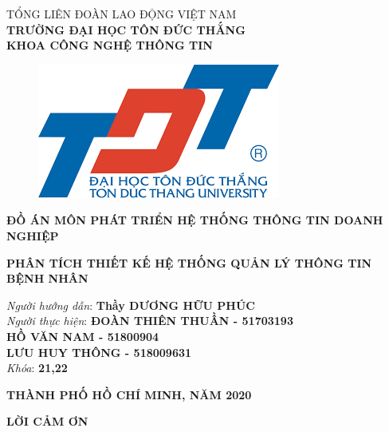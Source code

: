\documentclass{report}
\begin{document}
\begin{center}
	\fontsize{14}{20}\selectfont
	\textsc{TỔNG LIÊN ĐOÀN LAO ĐỘNG VIỆT NAM\\ 
		\textbf{TRƯỜNG ĐẠI HỌC TÔN ĐỨC THẮNG\\} 
		\textbf{KHOA CÔNG NGHỆ THÔNG TIN}}
	
	\vspace{0.08cm}
	\begin{figure}[htp]
		\begin{center}
			\includegraphics[scale=0.15]{Hinh/logo tdt.png}
		\end{center}
	\end{figure}
	
	\fontsize{16}{20}\selectfont\textbf{ĐỒ ÁN MÔN PHÁT TRIỂN HỆ THỐNG THÔNG TIN DOANH NGHIỆP\\}
	
	\vspace{1.1cm}
	\fontsize{24}{20}\selectfont\textbf{PHÂN TÍCH THIẾT KẾ HỆ THỐNG QUẢN LÝ THÔNG TIN BỆNH NHÂN}
\end{center}
\vspace{2cm}
\begin{flushright}
	\fontsize{14}{20}\selectfont
	\textit{Người hướng dẫn}: \textbf{Thầy DƯƠNG HỮU PHÚC}\\
	\textit{Người thực hiện}:
	\textbf{ĐOÀN THIÊN THUẦN - 51703193}\\
	\textbf{HỒ VĂN NAM - 51800904}\\
	\textbf{LƯU HUY THÔNG - 518009631}\\
	\textit{Khóa}: \textbf{21,22}\\
\end{flushright}
\vspace{4cm}
\begin{center}
	\fontsize{14}{20}\selectfont
	\textbf{THÀNH PHỐ HỒ CHÍ MINH, NĂM 2020}
\end{center}
\pagebreak
\pagestyle{fancy}
\fancyhf{}
\chead{\thepage}
\renewcommand{\headrulewidth}{0pt}
\begin{center}
	\setcounter{page}{1}
	\fontsize{16}{20}\selectfont
	\textbf{LỜI CẢM ƠN\\} 
\end{center}
	\fontsize{13}{15}\selectfont
\end{document}
